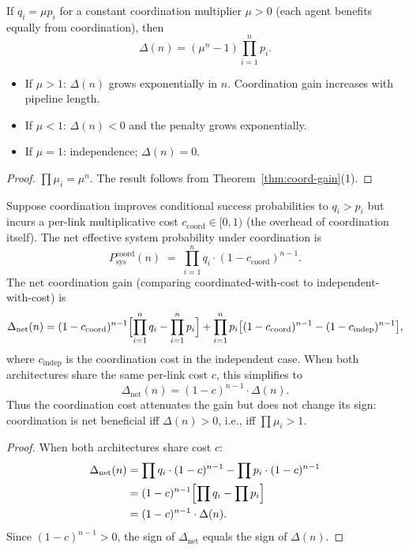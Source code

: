 \begin{corollary}
\label{cor:uniform-gain}
If $q_i = \mu p_i$ for a constant coordination multiplier $\mu > 0$ (each agent benefits
equally from coordination), then
\[
  \Delta(n) = (\mu^n - 1) \prod_{i=1}^{n} p_i.
\]
\begin{itemize}
  \item If $\mu > 1$: $\Delta(n)$ grows exponentially in $n$. Coordination gain increases
    with pipeline length.
  \item If $\mu < 1$: $\Delta(n) < 0$ and the penalty grows exponentially.
  \item If $\mu = 1$: independence; $\Delta(n) = 0$.
\end{itemize}
\end{corollary}

\begin{proof}
$\prod \mu_i = \mu^n$. The result follows from Theorem~\ref{thm:coord-gain}(1).
\end{proof}

\begin{theorem}
\label{thm:coord-gain-cost}
Suppose coordination improves conditional success probabilities to $q_i > p_i$ but
incurs a per-link multiplicative cost $c_{\mathrm{coord}} \in [0,1)$ (the overhead of
coordination itself). The net effective system probability under coordination is
\[
  P_{\mathrm{sys}}^{\mathrm{coord}}(n) \;=\; \prod_{i=1}^{n} q_i \cdot (1 - c_{\mathrm{coord}})^{n-1}.
\]
The net coordination gain (comparing coordinated-with-cost to independent-with-cost) is
\[
  \Delta_{\mathrm{net}}(n) = (1-c_{\mathrm{coord}})^{n-1}\Bigl[\prod_{i=1}^{n} q_i - \prod_{i=1}^{n} p_i\Bigr]
  + \prod_{i=1}^{n} p_i \bigl[(1-c_{\mathrm{coord}})^{n-1} - (1-c_{\mathrm{indep}})^{n-1}\bigr],
\]
where $c_{\mathrm{indep}}$ is the coordination cost in the independent case. When
both architectures share the same per-link cost $c$, this simplifies to
\[
  \Delta_{\mathrm{net}}(n) = (1-c)^{n-1} \cdot \Delta(n).
\]
Thus the coordination cost attenuates the gain but does not change its sign: coordination
is net beneficial iff $\Delta(n) > 0$, i.e., iff $\prod \mu_i > 1$.
\end{theorem}

\begin{proof}
When both architectures share cost $c$:
\begin{align*}
  \Delta_{\mathrm{net}}(n) &= \prod q_i \cdot (1-c)^{n-1} - \prod p_i \cdot (1-c)^{n-1} \\
  &= (1-c)^{n-1}\Bigl[\prod q_i - \prod p_i\Bigr] \\
  &= (1-c)^{n-1} \cdot \Delta(n).
\end{align*}
Since $(1-c)^{n-1} > 0$, the sign of $\Delta_{\mathrm{net}}$ equals the sign of $\Delta(n)$.
\end{proof}

